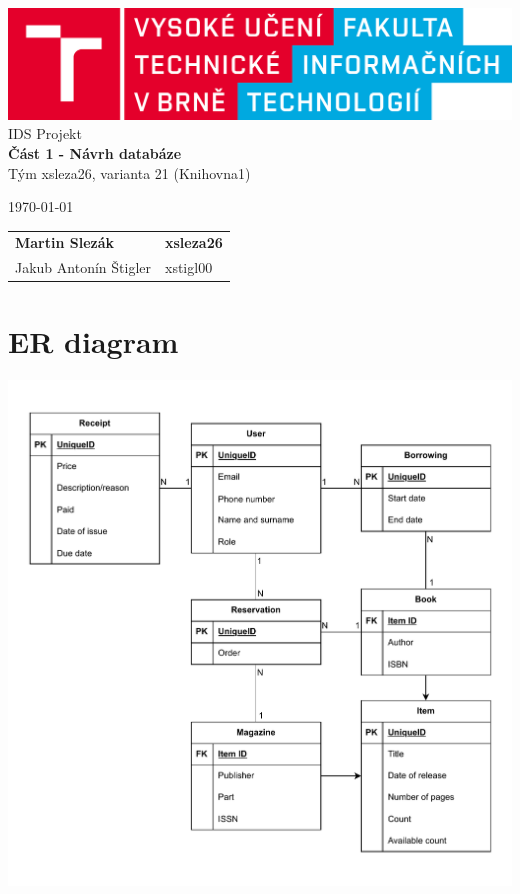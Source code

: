 \documentclass{article}
\begin{document}
\begin{titlepage}
    \begin{center}
        \includegraphics[width=1\textwidth]{assets/FIT_logo.png} \\
        \Huge{IDS Projekt} \\
        \Large{\textbf{Část 1 - Návrh databáze}} \\
        \large{Tým xsleza26, varianta 21 (Knihovna1)}
    \end{center}
    \vfill
    {
        \large \today \hfill
        \begin{tabular}{l l}
            \textbf{Martin Slezák} & \quad \textbf{xsleza26} \\
            Jakub Antonín Štigler  & \quad xstigl00          \\
        \end{tabular}
    }
\end{titlepage}

\section*{ER diagram}

\includegraphics*[width=1\textwidth]{assets/er.pdf}
\end{document}
